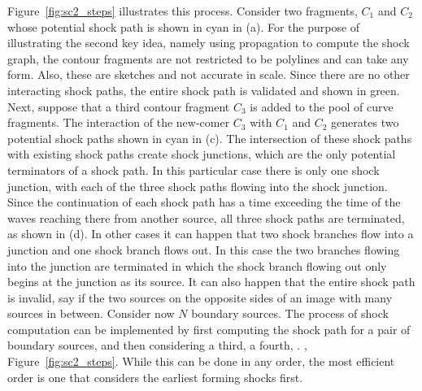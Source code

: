 Figure~\ref{fig:sc2_steps} illustrates this process. Consider two fragments, $C_1$ and $C_2$ whose potential shock path is shown in cyan in (a).  For the purpose of illustrating the second key idea, namely using propagation to compute the shock graph, the contour fragments are not restricted to be polylines and can take any form. Also, these are sketches and not accurate in scale. Since there are no other interacting shock paths, the entire shock path is validated and shown in green. Next, suppose that a third contour fragment $C_3$ is added to the pool of curve fragments. The interaction of the new-comer $C_3$ with $C_1$ and $C_2$ generates two potential shock paths shown in cyan in (c). The intersection of these shock paths with existing shock paths create shock junctions, which are the only potential terminators of a shock path. In this particular case there is only one shock junction, with each of the three shock paths flowing into the shock junction. Since the continuation of each shock path has a time exceeding the time of the waves reaching there from another source, all three shock paths are terminated, as shown in (d). In other cases it can happen that two shock branches flow into a junction and one shock branch flows out. In this case the two branches flowing into the junction are terminated in which the shock branch flowing out only begins at the junction as its source. It can also happen that the entire shock path is invalid, say if the two sources on the opposite sides of an image with many sources in between. Consider now $N$ boundary sources. The process of shock computation can be implemented by first computing the shock path for a pair of boundary sources, and then considering a third, a fourth, \etc. , Figure~\ref{fig:sc2_steps}. While this can be done in any order, the most efficient order is one that considers the earliest forming shocks first. 



